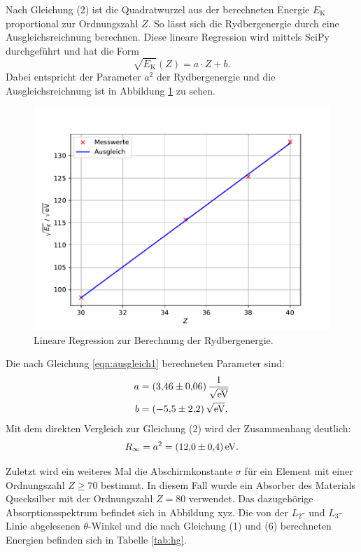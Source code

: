 \noindent Nach Gleichung (2) ist die Quadratwurzel aus der berechneten Energie $E_\text{K}$ proportional zur Ordnungszahl $Z$. So lässt sich die
Rydbergenergie durch eine Ausgleichsreichnung berechnen. Diese lineare Regression wird mittels SciPy durchgeführt und hat die Form
\begin{equation}
\label{eqn:ausgleich1}
  \sqrt{E_\text{K}}(Z) = a \cdot Z + b.
\end{equation}
Dabei entspricht der Parameter $a^2$ der Rydbergenergie und die Ausgleichsreichnung ist in Abbildung \ref{fig:ausgleich} zu sehen.
\begin{figure}[H]
  \center
  \includegraphics[scale = 0.75]{rydberg.pdf}
  \caption{Lineare Regression zur Berechnung der Rydbergenergie.}
  \label{fig:ausgleich}
\end{figure}
\noindent Die nach Gleichung \eqref{eqn:ausgleich1} berechneten Parameter sind:
\begin{align*}
a &= (\num{3.46 +- 0.06})\,\frac{1}{\sqrt{\si{\electronvolt}}} \\
b &= (\num{-5.5 +- 2.2})\,\sqrt{\si{\electronvolt}}.
\end{align*}
Mit dem direkten Vergleich zur Gleichung (2) wird der Zusammenhang deutlich:
\begin{align*}
R_\infty = a^2 = (\num{12.0 +- 0.4})\,\si{\electronvolt}.
\end{align*}

Zuletzt wird ein weiteres Mal die Abschirmkonstante $\sigma$ für ein Element mit einer Ordnungszahl $Z \geq 70$ bestimmt. In diesem Fall wurde ein Absorber des Materials
Quecksilber mit der Ordnungszahl $Z = 80$ verwendet. Das dazugehörige Absorptionsspektrum befindet sich in Abbildung xyz. Die von der $L_2$- und $L_3$-Linie abgelesenen $\theta$-Winkel
und die nach Gleichung (1) und (6) berechneten Energien befinden sich in Tabelle \ref{tab:hg}.

